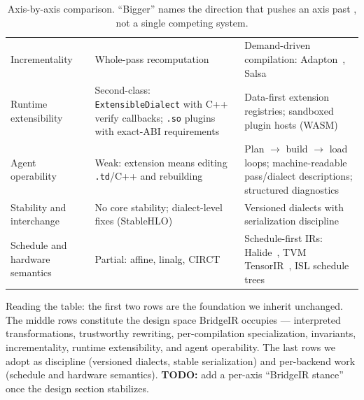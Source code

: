 \begin{table}[t]
\begin{tabularx}{\textwidth}{@{}>{\raggedright\arraybackslash}p{2.6cm} >{\raggedright\arraybackslash}X >{\raggedright\arraybackslash}X@{}}
  Incrementality &
  Whole-pass recomputation &
  Demand-driven compilation: Adapton~\cite{hammer2014adapton},
  Salsa~\cite{salsa} \\
  Runtime extensibility &
  Second-class: \texttt{ExtensibleDialect} with C++ verify callbacks;
  \texttt{.so} plugins with exact-ABI requirements &
  Data-first extension registries; sandboxed plugin hosts (WASM) \\
  Agent operability &
  Weak: extension means editing \texttt{.td}/C++ and rebuilding &
  Plan $\rightarrow$ build $\rightarrow$ load loops; machine-readable
  pass/dialect descriptions; structured diagnostics \\
  Stability and interchange &
  No core stability; dialect-level fixes (StableHLO)~\cite{stablehlo} &
  Versioned dialects with serialization discipline \\
  Schedule and hardware semantics &
  Partial: affine, linalg, CIRCT &
  Schedule-first IRs: Halide~\cite{ragankelley2013halide},
  TVM TensorIR~\cite{zheng2023tensorir}, ISL schedule trees \\
  \bottomrule
  \end{tabularx}
  \caption{Axis-by-axis comparison. ``Bigger'' names the direction that pushes an axis
  past \mlir{}, not a single competing system.}
  \label{tab:landscape}
\end{table}

Reading the table: the first two rows are the foundation we inherit unchanged. The
middle rows constitute the design space BridgeIR occupies --- interpreted
transformations, trustworthy rewriting, per-compilation specialization, invariants,
incrementality, runtime extensibility, and agent operability. The last rows we adopt
as discipline (versioned dialects, stable serialization) and per-backend work
(schedule and hardware semantics).
{\color{red}\textbf{TODO:} add a per-axis ``BridgeIR stance'' once the design section
stabilizes.}
